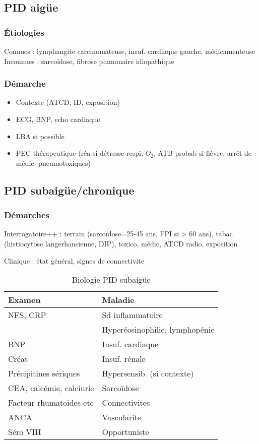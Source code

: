 \documentclass{article}
\begin{document}
\subsection{PID aigüe}
\subsubsection{Étiologies}
Connues : lymphangite carcinomateuse, insuf. cardiaque gauche, médicamenteuse\\
Inconnues : sarcoïdose, fibrose plumonaire idiopathique
\subsubsection{Démarche}
\begin{itemize}
\item Contexte (ATCD, ID, exposition)
\item ECG, BNP, echo cardiaque
\item LBA si possible
\item PEC thérapeutique (réa si détresse respi, \(O_2\), ATB probab si fièvre, arrêt de médic. pneumotoxiques)
\end{itemize}

\subsection{PID subaigüe/chronique}
\subsubsection{Démarches}
Interrogatoire++ : terrain (sarcoïdose=25-45 ans, FPI si > 60 ans), tabac (histiocytose langerhansienne, DIP), toxico, médic, ATCD radio, exposition

Clinique : état général, signes de connectivite


\begin{table}[htbp]
\caption{Biologie PID subaigüe}
\centering
\begin{tabular}{ll}
\toprule
Examen & Maladie\\
\midrule
NFS, CRP & Sd inflammatoire\\
 & Hyperéosinophilie, lymphopénie\\
BNP & Insuf. cardiaque\\
Créat & Insuf. rénale\\
Précipitines sériques & Hypersensib. (si contexte)\\
CEA, calcémie, calciurie & Sarcoïdose\\
Facteur rhumatoïdes etc & Connectivites\\
ANCA & Vascularite\\
Séro VIH & Opportuniste\\
\bottomrule
\end{tabular}
\end{table}
\end{document}

